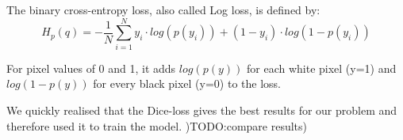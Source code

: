 The binary cross-entropy loss, also called Log loss, is defined by:
\begin{equation}\label{eq_bincross}
    H_p (q) = -\frac{1}{N} \sum ^N _{i=1} y_i \cdot log(p(y_i))+(1-y_i) \cdot log(1-p(y_i))
\end{equation}

For pixel values of 0 and 1, it adds $log(p(y))$ for each white pixel (y=1) and $log(1-p(y))$ for every black pixel (y=0) to the loss.

We quickly realised that the Dice-loss gives the best results for our problem and therefore used it to train the model. )TODO:compare results)

%

